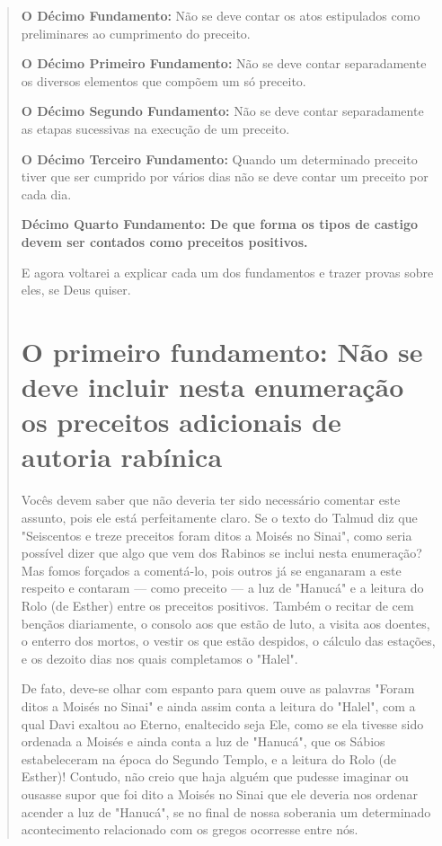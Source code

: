 \begin{quote}
\textbf{O Décimo Fundamento:} Não se deve contar os atos estipulados
como prelimi­nares ao cumprimento do preceito.

\textbf{O Décimo Primeiro Fundamento:} Não se deve contar separadamente
os diver­sos elementos que compõem um só preceito.

\textbf{O Décimo Segundo Fundamento:} Não se deve contar separadamente
as etapas sucessivas na execução de um preceito.

\textbf{O Décimo Terceiro Fundamento:} Quando um determinado preceito
tiver que ser cumprido por vários dias não se deve contar um preceito
por cada dia.

\textbf{Décimo Quarto Fundamento: De que forma os tipos de castigo
 devem ser contados como preceitos positivos.}

E agora voltarei a explicar cada um dos fundamentos e trazer provas
sobre eles, se Deus quiser.


\chapter{O primeiro fundamento: Não se deve incluir nesta enumeração os preceitos adicionais de autoria
rabínica}

Vocês devem saber que não deveria ter sido necessário comentar este
assunto, pois ele está perfeitamente claro. Se o texto do Talmud diz que
"Seiscen­tos e treze preceitos foram ditos a Moisés no Sinai", como
seria possível dizer que algo que vem dos Rabinos se inclui nesta
enumeração? Mas fomos forçados a comentá-lo, pois outros já se enganaram
a este respeito e contaram --- como pre­ceito --- a luz de "Hanucá" e a
leitura do Rolo (de Esther) entre os preceitos positi­vos. Também o
recitar de cem bençãos diariamente, o consolo aos que estão de luto, a
visita aos doentes, o enterro dos mortos, o vestir os que estão
despidos, o cálculo das estações, e os dezoito dias nos quais
completamos o "Halel".

De fato, deve-se olhar com espanto para quem ouve as palavras "Fo­ram
ditos a Moisés no Sinai" e ainda assim conta a leitura do "Halel", com a
qual Davi exaltou ao Eterno, enaltecido seja Ele, como se ela tivesse
sido orde­nada a Moisés e ainda conta a luz de "Hanucá", que os Sábios
estabeleceram na época do Segundo Templo, e a leitura do Rolo (de
Esther)! Contudo, não creio que haja alguém que pudesse imaginar ou
ousasse supor que foi dito a Moisés no Sinai que ele deveria nos ordenar
acender a luz de "Hanucá", se no final de nossa soberania um determinado
acontecimento relacionado com os gregos ocorresse entre nós.


\end{quote}

